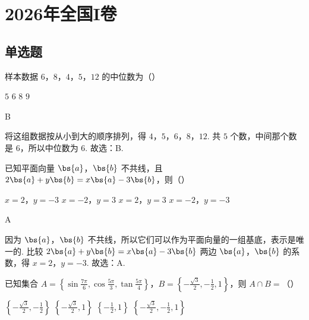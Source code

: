 \chapter{2026年全国I卷}

\section{单选题}

\begin{problem}
样本数据 \(6\)，\(8\)，\(4\)，\(5\)，\(12\) 的中位数为（\quad）

\choices
    {\(5\)}
    {\(6\)}
    {\(8\)}
    {\(9\)}
\end{problem}

\begin{answer}
B
\end{answer}

\begin{solution}
将这组数据按从小到大的顺序排列，得 \(4\)，\(5\)，\(6\)，\(8\)，\(12\). 共 \(5\) 个数，中间那个数是 \(6\)，所以中位数为 \(6\). 故选：B.
\end{solution}

\begin{problem}
已知平面向量 \(\bs{a}\)，\(\bs{b}\) 不共线，且 \(2\bs{a}+y\bs{b}=x\bs{a}-3\bs{b}\)，则（\quad）

\choices
    {\(x=2\)，\(y=-3\)}
    {\(x=-2\)，\(y=3\)}
    {\(x=2\)，\(y=3\)}
    {\(x=-2\)，\(y=-3\)}
\end{problem}

\begin{answer}
A
\end{answer}

\begin{solution}
因为 \(\bs{a}\)，\(\bs{b}\) 不共线，所以它们可以作为平面向量的一组基底，表示是唯一的. 比较
\(2\bs{a}+y\bs{b}=x\bs{a}-3\bs{b}\)
两边 \(\bs{a}\)，\(\bs{b}\) 的系数，得
\(x=2\)，\(y=-3\).
故选：A.
\end{solution}

\begin{problem}
已知集合 \(A=\left\{ \sin \frac{7\pi}{6},\cos \frac{5\pi}{3},\tan \frac{5\pi}{4} \right\}\)，\(B=\left\{ -\frac{\sqrt{3}}{2},-\frac{1}{2},1 \right\}\)，则 \(A\cap B=\)（\quad）

\choices
    {\(\left\{ -\frac{\sqrt{3}}{2},-\frac{1}{2} \right\}\)}
    {\(\left\{ -\frac{\sqrt{3}}{2},1 \right\}\)}
    {\(\left\{ -\frac{1}{2},1 \right\}\)}
    {\(\left\{ -\frac{\sqrt{3}}{2},-\frac{1}{2},1 \right\}\)}
\end{problem}

